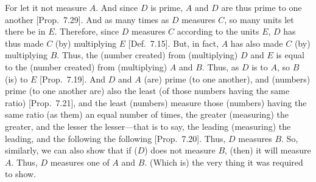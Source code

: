 \begin{Parallel}{}{}
{For let it not measure $A$. And since $D$ is prime, $A$ and $D$ are thus prime to
one another [Prop.~7.29]. 
And as many times as $D$ measures $C$, so many units let there be in $E$.
Therefore, since $D$ measures $C$ according to the units $E$, $D$ has thus
made $C$ (by) multiplying $E$ [Def.~7.15].
But, in fact, $A$ has also made $C$ (by) multiplying $B$. Thus, the
(number created) from (multiplying) $D$ and $E$ is equal to
the (number created) from (multiplying) $A$ and $B$. Thus, as $D$ is to $A$,
so $B$ (is) to $E$ [Prop.~7.19]. And
$D$ and $A$ (are) prime (to one another), and (numbers) prime (to one another
are) also the least (of those numbers having the same ratio) [Prop.~7.21], and the least (numbers) measure
those (numbers) having the same ratio (as them) an equal number of times, the
greater (measuring) the greater, and the lesser the lesser---that is to
say, the leading (measuring) the leading, and the following the following
[Prop.~7.20]. Thus, $D$ measures $B$. So,
 similarly, we can also show that if ($D$) does not measure $B$,  (then) it will measure
 $A$. Thus, $D$ measures one of $A$ and $B$. (Which is) the very thing it was required to show.}
\end{Parallel}

